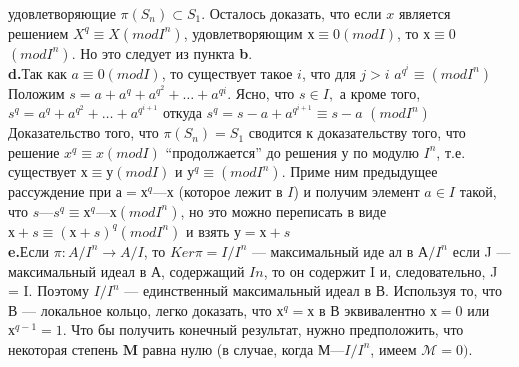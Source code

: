 удовлетворяющие $\pi(S_n) \subset S_1$. Осталось доказать, что если $x$ является
решением $X^{q} \equiv X (mod I^{n})$, удовлетворяющим $х \equiv 0 (mod I)$, то $х \equiv 0$
$(mod I^{n})$. Но это следует из пункта \textbf{b}.\\
\hspace*{15pt}\textbf{d.}Так как $a \equiv 0 (mod I)$, то существует такое $i$, что для $j > i$\linebreak
$a^{q^{i}} \equiv (mod I^{n})$ Положим $s = a + a^{q} + a^{q^{2}} +\ldots+ a^{q{i}}$. Ясно, что $s \in I,$\linebreak
а кроме того, $s^{q} = a^{q}+ a^{q^{2}} +\ldots+ a^{q^{i+1}}$ откуда $s^{q} = s - a + a^{q^{i+1}} \equiv s - a$\linebreak
$(mod I^{n})$\\
\hspace*{15pt}Доказательство того, что $\pi(S_n) = S_1$ сводится к доказательству
того, что решение $x^{q} \equiv x (mod I)$ “продолжается” до решения у по
модулю $I^{n}$, т.е. существует $х \equiv у (mod I)$ и $у^{q} \equiv (mod I^{n} )$. Приме­
ним предыдущее рассуждение при $а = х^{q} — х$ (которое лежит в $I$) и
получим элемент $a \in I$ такой, что $s — s^{q} \equiv х^{q} — х (mod I^{n})$, но это
можно переписать в виде $х + s \equiv (х + s)^{q} (mod I^{n})$ и взять $у = х + s$\\
\hspace*{15pt}\textbf{e.}Если $\pi : A/I^{n} \rightarrow A/I$, то $Ker\pi = I/I^{n}$ --- максимальный иде­
ал в $А/I^{n}$ если J — максимальный идеал в А, содержащий $I{n}$, то он
содержит I и, следовательно, J = I. Поэтому $I/I^{n}$ --- единственный
максимальный идеал в В. Используя то, что В — локальное кольцо,
легко доказать, что $х^{q} = х$ в В эквивалентно $х = 0$ или $х^{q-1} = 1$. Что­
бы получить конечный результат, нужно предположить, что некоторая
степень $\textbf{M}$ равна нулю (в случае, когда $\mathcal{М} — I/I^{n}$, имеем $\mathcal{M} = 0)$.
\newpage
